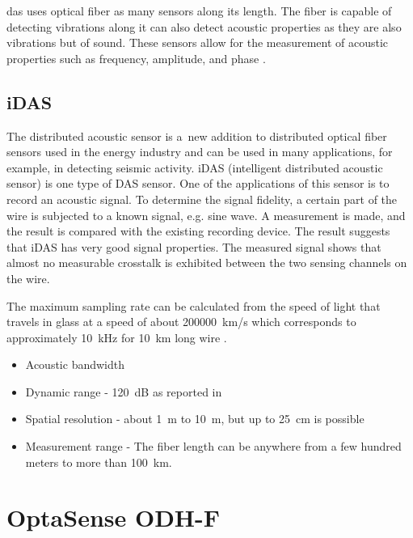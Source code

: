 \ac{das} uses optical fiber as many sensors along its length. The fiber is  capable of detecting vibrations along it can also detect acoustic properties as they are also vibrations but of sound. These sensors allow for the measurement of acoustic properties such as frequency, amplitude, and phase \cite{WangYu2017RDVM}. 


\subsection{iDAS}\label{txt.idas}


The distributed acoustic sensor is a~new addition to distributed optical fiber sensors used in the energy industry and can be used in many applications, for example, in detecting seismic activity. iDAS (intelligent distributed acoustic sensor) is one type of DAS sensor. One of the applications of this sensor is to record an acoustic signal. To determine the signal fidelity, a certain part of the wire is subjected to a known signal, e.g. sine wave. A measurement is made, and the result is compared with the existing recording device. The result suggests that iDAS has very good signal properties. The measured signal shows that almost no measurable crosstalk is exhibited between the two sensing channels on the wire.

The maximum sampling rate can be calculated from the speed of light that travels in glass at a speed of about \qty{200000}{\km/\s} which corresponds to approximately \qty{10}{\kHz} for \qty{10}{\km} long wire \cite{WangYu2017RDVM}.


\begin{itemize}
    \item Acoustic bandwidth
    \item Dynamic range - \qty{120}{\dB} as reported in \cite{dasseismic}
    \item Spatial resolution - about \qty{1}{\m} to \qty{10}{\m}, but up to \qty{25}{\cm} is possible
    \item Measurement range - The fiber length can be anywhere from a few hundred meters to more than \qty{100}{\km}.
\end{itemize}


\section{OptaSense ODH-F}\label{txt.optasense}

